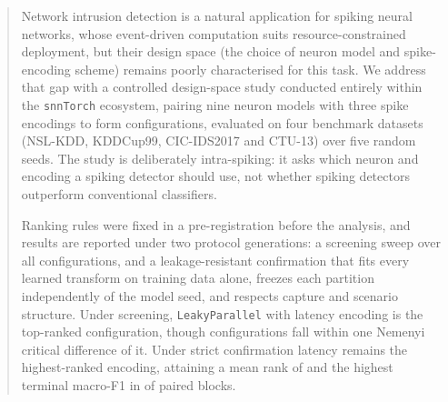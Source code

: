 %
%

\begin{abstract}
Network intrusion detection is a natural application for spiking neural
networks, whose event-driven computation suits resource-constrained deployment,
but their design space (the choice of neuron model and spike-encoding scheme)
remains poorly characterised for this task. We address that gap with a
controlled design-space study conducted entirely within the \texttt{snnTorch}
ecosystem, pairing nine neuron models with three spike encodings to form
\FNScrVariants{} configurations, evaluated on four benchmark datasets
(NSL-KDD, KDDCup99, CIC-IDS2017 and CTU-13) over five random seeds. The study is
deliberately intra-spiking: it asks which neuron and encoding a spiking detector
should use, not whether spiking detectors outperform conventional classifiers.

Ranking rules were fixed in a pre-registration before the analysis, and results
are reported under two protocol generations: a screening sweep over all
\FNScrVariants{} configurations, and a leakage-resistant confirmation that fits
every learned transform on training data alone, freezes each partition
independently of the model seed, and respects capture and scenario structure.
Under screening, \texttt{LeakyParallel} with latency encoding is the top-ranked
configuration, though \FNScrWithinCD{} configurations fall within one Nemenyi
critical difference of it. Under strict confirmation latency remains the
highest-ranked encoding, attaining a mean rank of \FNEncRank{} and the highest
terminal macro-F1 in \FNEncWins{} of \FNEncBlocks{} paired blocks.


\end{abstract}

